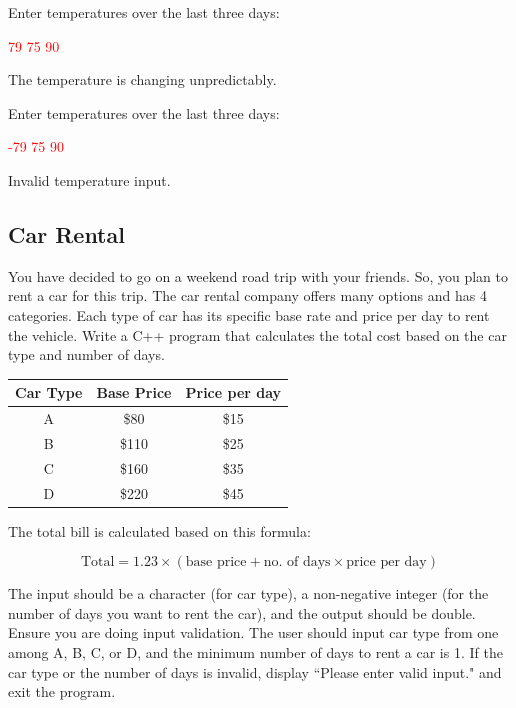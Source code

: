 \begin{sample}
Enter temperatures over the last three days:

\textcolor{red}{79 75 90}

The temperature is changing unpredictably.
\end{sample}

\begin{sample}
Enter temperatures over the last three days:

\textcolor{red}{-79 75 90}

Invalid temperature input.
\end{sample}

\subsection{Car Rental}

You have decided to go on a weekend road trip with your friends. So, you plan to rent a car for this trip. The car rental company offers many options and has 4 categories. Each type of car has its specific base rate and price per day to rent the vehicle. Write a C++ program that calculates the total cost based on the car type and number of days.

\begin{table}[H]
    \centering
    \begin{tabular}{c|c|c}
        Car Type & Base Price & Price per day \\
        \hline
        A & \$80 & \$15 \\ 
        B & \$110 & \$25 \\ 
        C & \$160 & \$35 \\ 
        D & \$220 & \$45
    \end{tabular}
\end{table}

The total bill is calculated based on this formula:

\[
\text{Total} = 1.23 \times (\text{base price} + \text{no. of days} \times \text{price per day})
\]


The input should be a character (for car type), a non-negative integer (for the number of days you want to rent the car), and the output should be double. \\

Ensure you are doing input validation. The user should input car type from one among A, B, C, or D, and the minimum number of days to rent a car is 1. If the car type or the number of days is invalid, display ``Please enter valid input." and exit the program.

